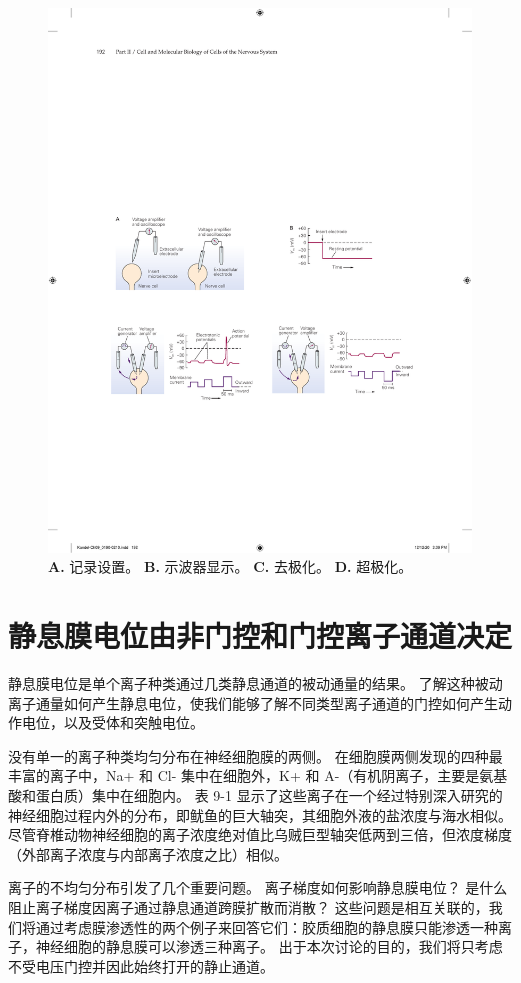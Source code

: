 \begin{figure}[htbp]
	\centering
	\includegraphics[width=0.8\linewidth]{chap09/fig_9_2}
	\caption{\textbf{A.} 记录设置。
	\textbf{B.} 示波器显示。
	\textbf{C.} 去极化。
	\textbf{D.} 超极化。}
	\label{fig:9_2}
\end{figure}



\section{静息膜电位由非门控和门控离子通道决定}

静息膜电位是单个离子种类通过几类静息通道的被动通量的结果。
了解这种被动离子通量如何产生静息电位，使我们能够了解不同类型离子通道的门控如何产生动作电位，以及受体和突触电位。


没有单一的离子种类均匀分布在神经细胞膜的两侧。
在细胞膜两侧发现的四种最丰富的离子中，Na+ 和 Cl- 集中在细胞外，K+ 和 A-（有机阴离子，主要是氨基酸和蛋白质）集中在细胞内。
表 9-1 显示了这些离子在一个经过特别深入研究的神经细胞过程内外的分布，即鱿鱼的巨大轴突，其细胞外液的盐浓度与海水相似。
尽管脊椎动物神经细胞的离子浓度绝对值比乌贼巨型轴突低两到三倍，但浓度梯度（外部离子浓度与内部离子浓度之比）相似。


离子的不均匀分布引发了几个重要问题。
离子梯度如何影响静息膜电位？
是什么阻止离子梯度因离子通过静息通道跨膜扩散而消散？
这些问题是相互关联的，我们将通过考虑膜渗透性的两个例子来回答它们：胶质细胞的静息膜只能渗透一种离子，神经细胞的静息膜可以渗透三种离子。
出于本次讨论的目的，我们将只考虑不受电压门控并因此始终打开的静止通道。




